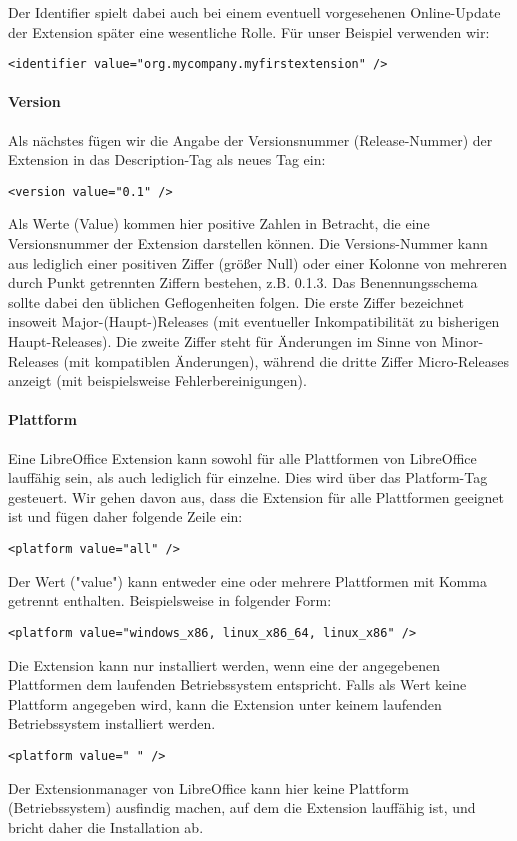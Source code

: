 \documentclass[a4paper,10pt,pagesize,titlepage]{scrbook}
\begin{document}
Der Identifier spielt dabei auch bei einem eventuell vorgesehenen Online-Update der Extension später eine wesentliche Rolle. Für unser Beispiel verwenden wir:
\begin{lstlisting}
<identifier value="org.mycompany.myfirstextension" />
\end{lstlisting}

\paragraph*{Version}$~~$\\

Als nächstes fügen wir die Angabe der Versionsnummer (Release-Nummer) der Extension in das Description-Tag als neues Tag ein:
\begin{lstlisting}
<version value="0.1" />
\end{lstlisting}
Als Werte (Value) kommen hier positive Zahlen in Betracht, die eine Versionsnummer der Extension darstellen können. Die Versions-Nummer kann aus lediglich einer positiven Ziffer (größer Null) oder einer Kolonne von mehreren durch Punkt getrennten Ziffern bestehen, z.B. 0.1.3. Das Benennungsschema sollte dabei den üblichen Geflogenheiten folgen. Die erste Ziffer bezeichnet insoweit Major-(Haupt-)Releases (mit eventueller Inkompatibilität zu bisherigen Haupt-Releases). Die zweite Ziffer steht für Änderungen im Sinne von Minor-Releases (mit kompatiblen Änderungen), während die dritte Ziffer Micro-Releases anzeigt (mit beispielsweise Fehlerbereinigungen).

\newpage
\paragraph*{Plattform}$~~$\\

Eine LibreOffice Extension kann sowohl für alle Plattformen von LibreOffice lauffähig sein, als auch lediglich für einzelne. Dies wird über das Platform-Tag gesteuert. Wir gehen davon aus, dass die Extension für alle Plattformen geeignet ist und fügen daher folgende Zeile ein:
\begin{lstlisting}
<platform value="all" />
\end{lstlisting}
Der Wert ("value") kann entweder eine oder mehrere Plattformen mit Komma getrennt enthalten. Beispielsweise in folgender Form:
\begin{lstlisting}
<platform value="windows_x86, linux_x86_64, linux_x86" /> 
\end{lstlisting} 
Die Extension kann nur installiert werden, wenn eine der angegebenen Plattformen dem laufenden Betriebssystem entspricht. Falls als Wert keine Plattform angegeben wird, kann die Extension unter keinem laufenden Betriebssystem installiert werden.
\begin{lstlisting}
<platform value=" " />
\end{lstlisting}
Der Extensionmanager von LibreOffice kann hier keine Plattform (Betriebssystem) ausfindig machen, auf dem die Extension lauffähig ist, und bricht daher die Installation ab.
\end{document}
